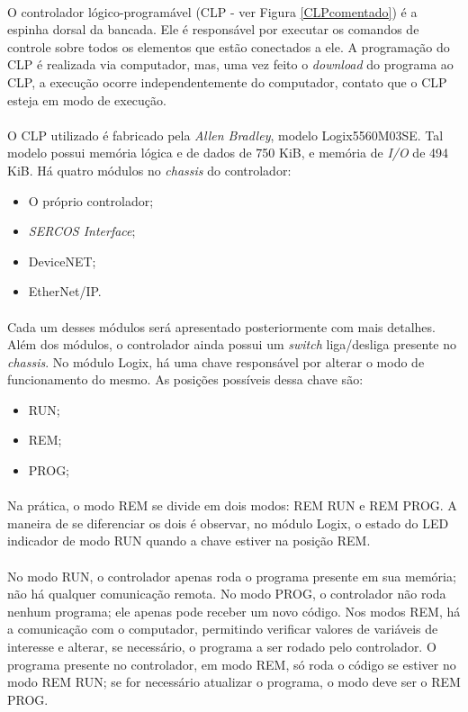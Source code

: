 \paragraph{} O controlador lógico-programável (CLP - ver Figura \ref{CLPcomentado}) é a espinha dorsal da bancada. Ele é responsável por executar os comandos de controle sobre todos os elementos que estão conectados a ele. A programação do CLP é realizada via computador, mas, uma vez feito o \textit{download} do programa ao CLP, a execução ocorre independentemente do computador, contato que o CLP esteja em modo de execução.
\paragraph{} O CLP utilizado é fabricado pela \textit{Allen Bradley}, modelo Logix5560M03SE. Tal modelo possui memória lógica e de dados de 750 KiB, e memória de \textit{I/O} de 494 KiB. Há quatro módulos no \textit{chassis} do controlador:
\begin{itemize}
  \item O próprio controlador;
  \item \textit{SERCOS Interface};
  \item DeviceNET;
  \item EtherNet/IP.
\end{itemize}
\paragraph{} Cada um desses módulos será apresentado posteriormente com mais detalhes. Além dos módulos, o controlador ainda possui um \textit{switch} liga/desliga presente no \textit{chassis}. No módulo Logix, há uma chave responsável por alterar o modo de funcionamento do mesmo. As posições possíveis dessa chave são:
\begin{itemize}
  \item RUN;
  \item REM;
  \item PROG;
\end{itemize}
\paragraph{} Na prática, o modo REM se divide em dois modos: REM RUN e REM PROG. A maneira de se diferenciar os dois é observar, no módulo Logix, o estado do LED indicador de modo RUN quando a chave estiver na posição REM.
\paragraph{} No modo RUN, o controlador apenas roda o programa presente em sua memória; não há qualquer comunicação remota. No modo PROG, o controlador não roda nenhum programa; ele apenas pode receber um novo código. Nos modos REM, há a comunicação com o computador, permitindo verificar valores de variáveis de interesse e alterar, se necessário, o programa a ser rodado pelo controlador. O programa presente no controlador, em modo REM, só roda o código se estiver no modo REM RUN; se for necessário atualizar o programa, o modo deve ser o REM PROG.

